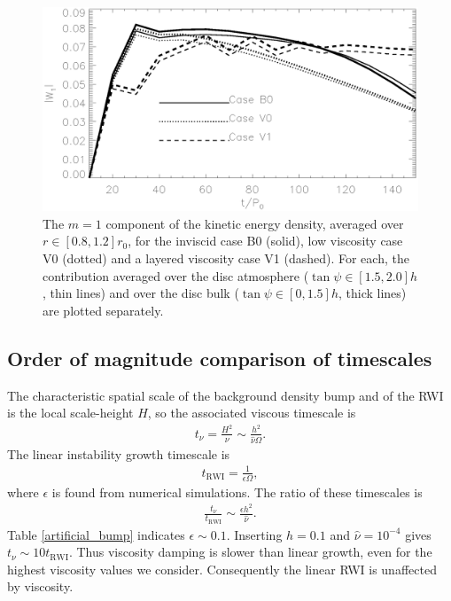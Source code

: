 \begin{figure}
  \centering
  \includegraphics[width=\linewidth]{figures/pdisk_kerz_cases_bump}
  \caption{The $m=1$ component of the kinetic energy density, averaged
    over $r\in[0.8,1.2]r_0$, for the inviscid case B0 (solid), low
    viscosity case V0 (dotted) and a layered viscosity case V1 (dashed). 
    For each, the contribution 
    averaged over the disc atmosphere ($\tan{\psi}\in[1.5,2.0]h$, thin
    lines) and over the
    disc bulk ($\tan{\psi}\in[0,1.5]h$, thick lines) are plotted
    separately. 
    \label{bump_energy}}
\end{figure}



\subsection{Order of magnitude comparison of timescales}

The characteristic spatial scale of the background density bump and of
the RWI is the local scale-height $H$, so the associated
viscous timescale is    
\begin{align}
  t_\nu = \frac{H^2}{\nu}\sim \frac{h^2}{\hat{\nu}\Omega}. 
\end{align}
The linear instability growth timescale is
\begin{align}
  t_\mathrm{RWI} = \frac{1}{\epsilon \Omega},
\end{align}
where $\epsilon$ is found from numerical simulations.   
The ratio of these timescales is
\begin{align}
  \frac{t_\nu}{t_\mathrm{RWI}} \sim \frac{\epsilon h^2}{\hat{\nu}}.
\end{align}
Table \ref{artificial_bump} indicates $\epsilon \sim 0.1$. 
Inserting $h=0.1$ and $\hat{\nu}=10^{-4}$ gives $t_\nu \sim 10
t_\mathrm{RWI}$. Thus viscosity damping is slower than linear
growth, even for the highest viscosity values we consider. 
Consequently the linear RWI is unaffected by viscosity. 

